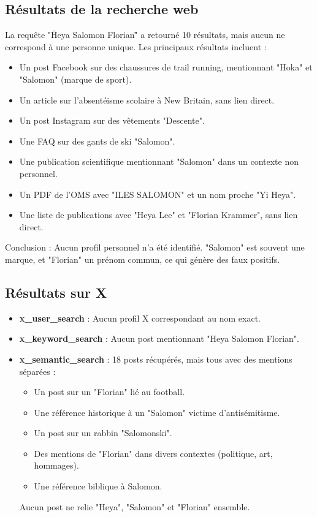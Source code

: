 \documentclass[12pt,a4paper]{article}
\begin{document}
\subsection{Résultats de la recherche web}
La requête "\"Heya Salomon Florian\"" a retourné 10 résultats, mais aucun ne correspond à une personne unique. Les principaux résultats incluent :
\begin{itemize}
    \item Un post Facebook sur des chaussures de trail running, mentionnant "Hoka" et "Salomon" (marque de sport).
    \item Un article sur l'absentéisme scolaire à New Britain, sans lien direct.
    \item Un post Instagram sur des vêtements "Descente".
    \item Une FAQ sur des gants de ski "Salomon".
    \item Une publication scientifique mentionnant "Salomon" dans un contexte non personnel.
    \item Un PDF de l'OMS avec "ILES SALOMON" et un nom proche "Yi Heya".
    \item Une liste de publications avec "Heya Lee" et "Florian Krammer", sans lien direct.
\end{itemize}
Conclusion : Aucun profil personnel n'a été identifié. "Salomon" est souvent une marque, et "Florian" un prénom commun, ce qui génère des faux positifs.

\subsection{Résultats sur X}
\begin{itemize}
    \item \textbf{x\_user\_search} : Aucun profil X correspondant au nom exact.
    \item \textbf{x\_keyword\_search} : Aucun post mentionnant "Heya Salomon Florian".
    \item \textbf{x\_semantic\_search} : 18 posts récupérés, mais tous avec des mentions séparées :
        \begin{itemize}
            \item Un post sur un "Florian" lié au football.
            \item Une référence historique à un "Salomon" victime d'antisémitisme.
            \item Un post sur un rabbin "Salomonski".
            \item Des mentions de "Florian" dans divers contextes (politique, art, hommages).
            \item Une référence biblique à Salomon.
        \end{itemize}
    Aucun post ne relie "Heya", "Salomon" et "Florian" ensemble.
\end{itemize}
\end{document}
